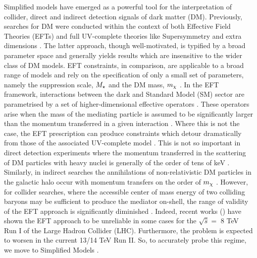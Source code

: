 
Simplified models have emerged as a powerful tool for the interpretation of collider, direct and indirect detection signals of dark matter (DM). Previously,  searches for DM were conducted within the context of both Effective Field Theories (EFTs) \cite{Aad:1363019, ATLAS-CONF-2012-147, CMS-PAS-EXO-12-048, Buckley:2013jwa, Abdallah:1472683, MonoZ, MonoX} and full UV-complete theories like Supersymmetry \cite{ComppMSSM, Aad:2012ms, Aad:2012fqa, Aad:2014wea, SUSY_official_paper} and extra dimensions \cite{}. The latter approach, though well-motivated, is typified by a broad parameter space and generally yields results which are insensitive to the wider class of DM models. EFT constraints, in comparison, are applicable to a broad range of models and rely on the specification of only a small set of parameters, namely the suppression scale, $M_{\star}$ and the DM mass, $m_{\chi}$ \cite{}.
In the EFT framework, interactions between the dark and Standard Model (SM) sector are parametrised by a set of higher-dimensional effective operators \cite{}. These operators arise when the mass of the mediating particle is assumed to be significantly larger than the momentum transferred in a given interaction \cite{}. Where this is not the case, the EFT prescription can produce constraints which detour dramatically from those of the associated UV-complete model \cite{Bai:2010hh, DMCons2, Fox:2011fx, Graesser:2011vj, An:2011ck}. This is not so important in direct detection experiments where the momentum transferred in the scattering of DM particles with heavy nuclei is generally of the order of tens of keV \cite{EFTDM, DMCons3}. Similarly, in indirect searches the annihilations of non-relativistic DM particles in the galactic halo occur with momentum transfers on the order of $m_{\chi}$ \cite{}. However, for collider searches, where the accessible center of mass energy of two colliding baryons may be sufficient to produce the mediator on-shell, the range of validity of the EFT approach is significantly diminished \cite{}. Indeed, recent works (\cite{}) have shown the EFT approach to be unreliable in some cases for the $\sqrt{\hat{s}} =$ 8 TeV Run I of the Large Hadron Collider (LHC). Furthermore, the problem is expected to worsen in the current 13/14 TeV Run II. So, to accurately probe this regime, we move to Simplified Models \cite{Buchmueller:2014yoa}.

